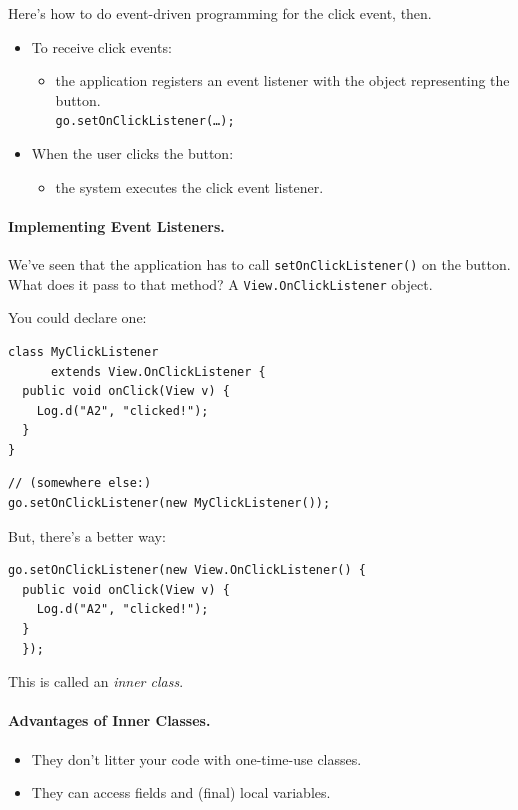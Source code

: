 Here's how to do event-driven programming for the click event, then.
\begin{itemize}
\item To receive click events: 
\begin{itemize} \item the application registers an event 
listener with the object representing the button.\\
{\tt \qquad go.setOnClickListener(\ldots);}
\end{itemize}
\item When the user clicks the button: 
\begin{itemize}
\item the system executes the click event listener.
\end{itemize}
\end{itemize}

\paragraph{Implementing Event Listeners.}
We've seen that the application has to call {\tt setOnClickListener()} 
on the button. What does it pass to that method? A {\tt View.OnClickListener} object.

You could declare one:

{\small
\begin{minipage}{.5\textwidth}
\begin{verbatim}
class MyClickListener 
      extends View.OnClickListener {
  public void onClick(View v) {
    Log.d("A2", "clicked!");
  }
}
\end{verbatim}
\end{minipage}
\begin{minipage}{.5\textwidth}
\begin{verbatim}
// (somewhere else:)
go.setOnClickListener(new MyClickListener()); 
\end{verbatim}
\end{minipage}
}

But, there's a better way:

{\small
\begin{verbatim}
go.setOnClickListener(new View.OnClickListener() {
  public void onClick(View v) {
    Log.d("A2", "clicked!");
  }
  }); 
\end{verbatim}
}

This is called an \emph{inner class}.

\paragraph{Advantages of Inner Classes.}
\begin{itemize}
\item They don't litter your code with one-time-use classes.
\item They can access fields and (final) local variables.
\end{itemize}

